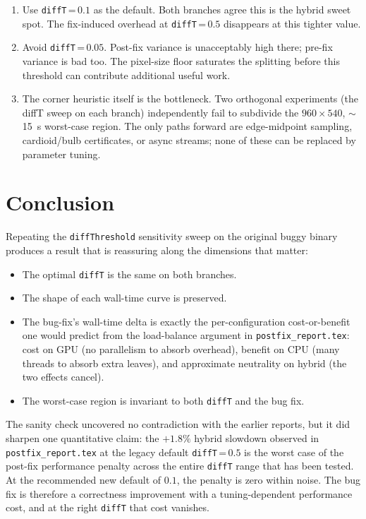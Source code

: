 \documentclass[
	english,
	letterpaper, oneside
]{article}
\begin{document}
\begin{enumerate}
    \item Use \texttt{diffT}\,=\,$0.1$ as the default. Both
    branches agree this is the hybrid sweet spot. The fix-induced
    overhead at \texttt{diffT}\,=\,$0.5$ disappears at this
    tighter value.
    \item Avoid \texttt{diffT}\,=\,$0.05$. Post-fix variance
    is unacceptably high there; pre-fix variance is bad too. The
    pixel-size floor saturates the splitting before this threshold
    can contribute additional useful work.
    \item The corner heuristic itself is the bottleneck.
    Two orthogonal experiments (the diffT sweep on each branch)
    independently fail to subdivide the $960\times540$, $\sim$15~s
    worst-case region. The only paths forward are edge-midpoint
    sampling, cardioid/bulb certificates, or async streams; none of
    these can be replaced by parameter tuning.
\end{enumerate}

\section{Conclusion}

Repeating the \texttt{diffThreshold} sensitivity sweep on the
original buggy binary produces a result that is reassuring along the
dimensions that matter:

\begin{itemize}
    \item The optimal \texttt{diffT} is the same on both branches.
    \item The shape of each wall-time curve is preserved.
    \item The bug-fix's wall-time delta is exactly the per-configuration
    cost-or-benefit one would predict from the load-balance argument
    in \texttt{postfix\_report.tex}: cost on GPU (no parallelism to
    absorb overhead), benefit on CPU (many threads to absorb extra
    leaves), and approximate neutrality on hybrid (the two effects
    cancel).
    \item The worst-case region is invariant to both \texttt{diffT}
    and the bug fix.
\end{itemize}

\noindent
The sanity check uncovered no contradiction with the earlier
reports, but it did sharpen one quantitative claim: the
$+1.8\%$ hybrid slowdown observed in \texttt{postfix\_report.tex} at
the legacy default \texttt{diffT}\,=\,$0.5$ is the worst case of the
post-fix performance penalty across the entire \texttt{diffT} range
that has been tested. At the recommended new default of $0.1$, the
penalty is zero within noise. The bug fix is therefore a correctness
improvement with a tuning-dependent performance cost, and at the
right \texttt{diffT} that cost vanishes.
\end{document}

